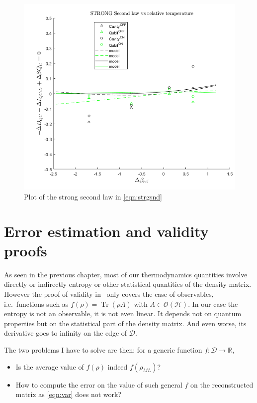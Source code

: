 \documentclass[10pt,a4paper]{report}
\theoremstyle{plain}
\theoremstyle{definition}
\theoremstyle{remark}
\newcommand{\R}{\ensuremath{\mathbb{R}}}
\DeclareMathOperator{\Tr}{Tr}
\newcommand{\ml}{_{M\!L}}
\begin{document}
\begin{figure}
  \centering
  \includegraphics[height=0.45\textheight]{plots/Strg1.png}
  \caption{Plot of the strong second law in \cref{eqn:strgsnd}}\label{fig:strg1}
\end{figure}

\chapter{Error estimation and validity proofs}

As seen in the previous chapter, most of our thermodynamics quantities involve
directly or indirectly entropy or other statistical quantities of the density
matrix. However the proof of validity in~\cite{SPRAL17} only covers the case of
observables, i.e.\ functions such as $f(\rho) = \Tr(\rho A)$ with $A \in
\mathcal{O}(\mathcal{H})$. In our case the entropy is not an observable, it is not even
linear. It depends not on quantum properties but on the statistical part of the
density matrix. And even worse, its derivative goes to infinity on the edge of
$\mathcal{D}$.

The two problems I have to solve are then:
for a generic function $f : \mathcal{D}
\to \R$,
\begin{itemize}
\item Is the average value of $f(\rho)$ indeed $f(\rho\ml)$?
\item How to compute the error on the value of such general $f$ on the reconstructed
  matrix as \cref{eqn:var} does not work?
\end{itemize}
\end{document}
